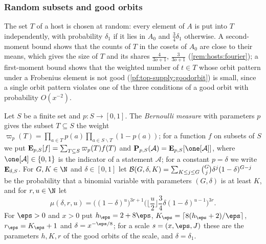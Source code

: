 \subsubsection{Random subsets and good orbits}\label{sec:pf:top-supply:randomT}

The set $T$ of a host is chosen at random: every element of $A$ is put into $T$ independently, with probability
$\delta_1$ if it lies in $A_0$ and $\frac34\delta_1$ otherwise. A second-moment bound shows that the counts of $T$ in
the cosets of $A_0$ are close to their means, which gives the size of $T$ and its shares $\frac4{3o+1}$, $\frac3{3o+1}$
(\cref{rem:hosts:fourier}); a first-moment bound shows that the weighted number of $t\in T$ whose orbit pattern under a
Frobenius element is not good (\cref{pf:top-supply:goodorbit}) is small, since a single orbit pattern violates one of the
three conditions of a good orbit with probability $O(x^{-2})$.

\begin{definition}\label{pf:top-supply:bernoulli}
Let $S$ be a finite set and $p:S\to[0,1]$. The \emph{Bernoulli measure} with parameters $p$ gives the subset $T\subseteq S$
the weight $\varpi_p(T)=\prod_{a\in T}p(a)\prod_{a\in S\smallsetminus T}(1-p(a))$; for a function $f$ on subsets of $S$
we put $\mathbf{E}_{p,S}[f]=\sum_{T\subseteq S}\varpi_p(T)f(T)$ and $\topsupplyPr_{p,S}(\mathcal A)=\topsupplyE_{p,S}[\one[\mathcal A]]$,
where $\one[\mathcal A]\in\{0,1\}$ is the indicator of a statement $\mathcal A$; for a constant $p=\delta$ we write
$\mathbf{E}_{\delta,S}$. For $G,K\in\N$ and $\delta\in[0,1]$ let
$\mathcal{B}(G,\delta,K)=\sum_{K\le j\le G}\binom Gj\delta^j(1-\delta)^{G-j}$ be the probability that a binomial variable
with parameters $(G,\delta)$ is at least $K$, and for $r,u\in\N$ let
\[
\mu(\delta,r,u)=\big((1-\delta)^u\big)^{3r+1}\Big(\Big\lfloor\frac u2\Big\rfloor\frac34\delta(1-\delta)^{u-1}\Big)^{3r}.
\]
For $\eps>0$ and $x>0$ put $h_\eps=2+8\eps$, $K_\eps=\lceil8(h_\eps+2)/\eps\rceil$, $r_\eps=K_\eps+1$ and $\delta=x^{-\eps/8}$;
for a scale $s=(x,\eps,J)$ these are the parameters $h,K,r$ of the good orbits of the scale, and $\delta=\delta_1$.
 
 
 
 
 
 
 
\end{definition}

